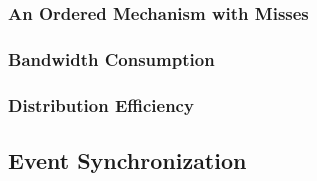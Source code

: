 \documentclass{sigchi}
\begin{document}



\subsubsection{An Ordered Mechanism with Misses}




\subsubsection{Bandwidth Consumption}

\subsubsection{Distribution Efficiency}


\subsection{Event Synchronization}
\label{eventsync}



\end{document}
